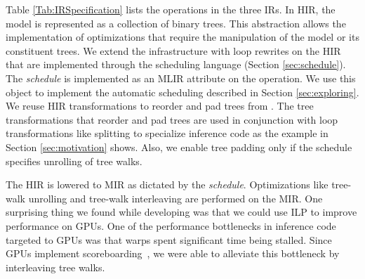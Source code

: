 Table \ref{Tab:IRSpecification} lists the operations in the three IRs. 
In HIR, the model is represented as a collection of binary trees. This abstraction
allows the implementation of optimizations that require the manipulation of the model
or its constituent trees. We extend the \TreebeardOLD{} infrastructure with loop rewrites on 
the HIR that are implemented through the scheduling language (Section \ref{sec:schedule}).
The \emph{schedule} is implemented as an MLIR attribute on the  operation.
We use this object to implement the automatic scheduling described in Section \ref{sec:exploring}. 
We reuse HIR transformations to reorder and pad trees from \TreebeardOLD{}.
The tree transformations that reorder and pad trees are used in conjunction 
with loop transformations like splitting to specialize inference code as the example 
in Section \ref{sec:motivation} shows. Also, we enable tree padding only if the schedule 
specifies unrolling of tree walks.

The HIR is lowered to MIR as dictated by the \emph{schedule}.
Optimizations like tree-walk unrolling and tree-walk interleaving
are performed on the MIR. 
One surprising thing we found while developing \Treebeard{} was that 
we could use ILP to improve performance on GPUs. 
One of the performance bottlenecks in inference code targeted 
to GPUs was that warps spent significant time being stalled. Since GPUs 
implement scoreboarding~\cite{HennesseyPatterson}, we were able to 
alleviate this bottleneck by interleaving tree walks. 

